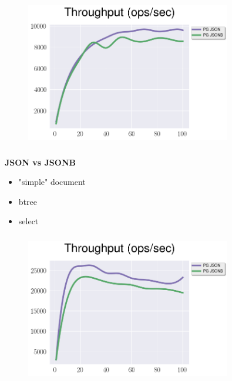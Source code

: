 \documentclass[usenames,dvipsnames, 18pt, compress, aspectratio=169]{beamer}
\begin{document}
\begin{frame}
    \frametitle{}
    \begin{center}
    \vspace{10pt}
    \begin{figure}
        \includegraphics[width=0.8\textwidth,center]{benchmarks/postgresql_load_json_jsonb.png}
    \end{figure}
    \end{center}
\end{frame}

\begin{frame}
    \frametitle{}
    \begin{center}
        \textbf{JSON vs JSONB}
        \begin{itemize}[label={}]
            \item "simple" document
            \item btree
            \item select
        \end{itemize}
    \end{center}
\end{frame}

\begin{frame}
    \frametitle{}
    \begin{center}
    \vspace{10pt}
    \begin{figure}
        \includegraphics[width=0.8\textwidth,center]{benchmarks/postgresql_select_json_jsonb.png}
    \end{figure}
    \end{center}
\end{frame}
\end{document}
